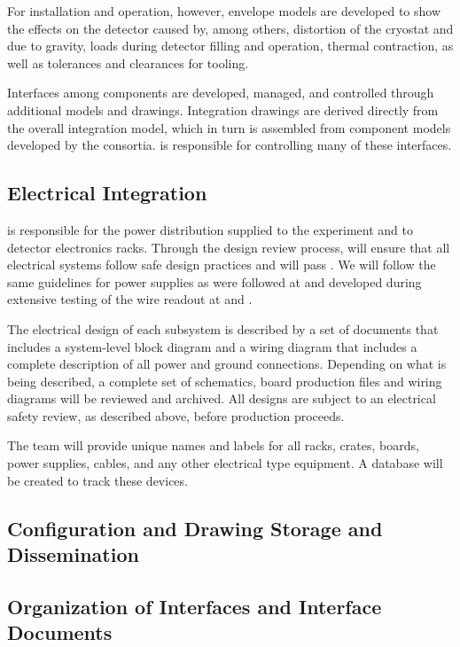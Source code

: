 For installation and operation, however, envelope models  are developed to 
show the effects on the detector 
caused by, among others, distortion of the cryostat and  due to gravity, loads  during 
detector filling and operation, thermal contraction,  as well as tolerances and clearances for tooling.

Interfaces among components are developed, managed, and controlled through additional models and drawings. 
Integration drawings are derived directly from the overall
integration model, which in turn is assembled from
component models developed by the consortia.
 is responsible for controlling many of these interfaces. 

\subsection{Electrical Integration}
\label{sec:es-tc-elec}

 is responsible for the  power
distribution supplied to the experiment and to detector electronics
racks.  Through the design review process,  will  ensure 
that all electrical systems  follow safe design practices and
will pass . We will follow the same  guidelines\cite{bib:cernedms2095958} for  power supplies as
were followed at  and developed during extensive testing of
the  wire readout at  and .  

The electrical design of each subsystem is described by a set of
documents that includes a system-level block diagram and a wiring
diagram that includes a complete description of all power and ground
connections.  Depending on what is being described, a complete set of
schematics, board production files and wiring diagrams will be
reviewed and archived.  All designs are subject to an electrical safety
review, as described above, before production proceeds. 

The  team will provide unique names and labels
for all racks, crates, boards, power supplies, cables, and any other
electrical type equipment.  A database will be created to track these
devices.

\subsection{Configuration and Drawing Storage and Dissemination}
\subsection{Organization of Interfaces and Interface Documents}

